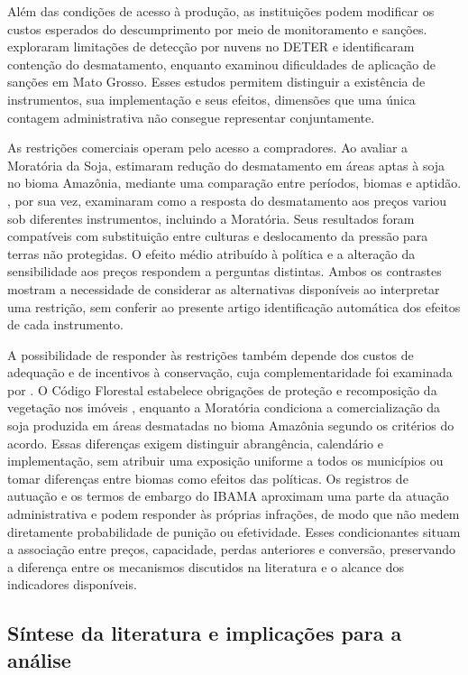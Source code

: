Além das condições de acesso à produção, as instituições podem modificar os custos esperados do descumprimento por meio de monitoramento e sanções.  exploraram limitações de detecção por nuvens no DETER e identificaram contenção do desmatamento, enquanto  examinou dificuldades de aplicação de sanções em Mato Grosso. Esses estudos permitem distinguir a existência de instrumentos, sua implementação e seus efeitos, dimensões que uma única contagem administrativa não consegue representar conjuntamente.

As restrições comerciais operam pelo acesso a compradores. Ao avaliar a Moratória da Soja,  estimaram redução do desmatamento em áreas aptas à soja no bioma Amazônia, mediante uma comparação entre períodos, biomas e aptidão. , por sua vez, examinaram como a resposta do desmatamento aos preços variou sob diferentes instrumentos, incluindo a Moratória. Seus resultados foram compatíveis com substituição entre culturas e deslocamento da pressão para terras não protegidas. O efeito médio atribuído à política e a alteração da sensibilidade aos preços respondem a perguntas distintas. Ambos os contrastes mostram a necessidade de considerar as alternativas disponíveis ao interpretar uma restrição, sem conferir ao presente artigo identificação automática dos efeitos de cada instrumento.

A possibilidade de responder às restrições também depende dos custos de adequação e de incentivos à conservação, cuja complementaridade foi examinada por . O Código Florestal estabelece obrigações de proteção e recomposição da vegetação nos imóveis \cite{Brasil2012}, enquanto a Moratória condiciona a comercialização da soja produzida em áreas desmatadas no bioma Amazônia segundo os critérios do acordo. Essas diferenças exigem distinguir abrangência, calendário e implementação, sem atribuir uma exposição uniforme a todos os municípios ou tomar diferenças entre biomas como efeitos das políticas. Os registros de autuação e os termos de embargo do IBAMA aproximam uma parte da atuação administrativa e podem responder às próprias infrações, de modo que não medem diretamente probabilidade de punição ou efetividade. Esses condicionantes situam a associação entre preços, capacidade, perdas anteriores e conversão, preservando a diferença entre os mecanismos discutidos na literatura e o alcance dos indicadores disponíveis.

\subsection{Síntese da literatura e implicações para a análise}
\label{literatura-sintese}

